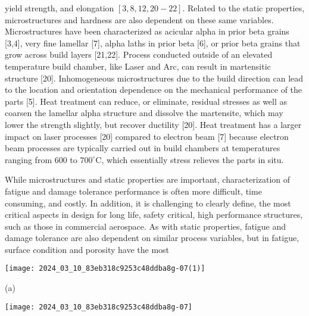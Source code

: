 \documentclass[10pt]{article}
\begin{document}
yield strength, and elongation $[3,8,12,20-22]$. Related to the static properties, microstructures and hardness are also dependent on these same variables. Microstructures have been characterized as acicular alpha in prior beta grains [3,4], very fine lamellar [7], alpha laths in prior beta [6], or prior beta grains that grow across build layers [21,22]. Process conducted outside of an elevated temperature build chamber, like Laser and Arc, can result in martensitic structure [20]. Inhomogeneous microstructures due to the build direction can lead to the location and orientation dependence on the mechanical performance of the parts [5]. Heat treatment can reduce, or eliminate, residual stresses as well as coarsen the lamellar alpha structure and dissolve the martensite, which may lower the strength slightly, but recover ductility [20]. Heat treatment has a larger impact on laser processes [20] compared to electron beam [7] because electron beam processes are typically carried out in build chambers at temperatures ranging from 600 to $700^{\circ} \mathrm{C}$, which essentially stress relieves the parts in situ.

While microstructures and static properties are important, characterization of fatigue and damage tolerance performance is often more difficult, time consuming, and costly. In addition, it is challenging to clearly define, the most critical aspects in design for long life, safety critical, high performance structures, such as those in commercial aerospace. As with static properties, fatigue and damage tolerance are also dependent on similar process variables, but in fatigue, surface condition and porosity have the most

\begin{center}
\texttt{[image: 2024\_03\_10\_83eb318c9253c48ddba8g-07(1)]}
\end{center}

(a)

\begin{center}
\texttt{[image: 2024\_03\_10\_83eb318c9253c48ddba8g-07]}
\end{center}
\end{document}
